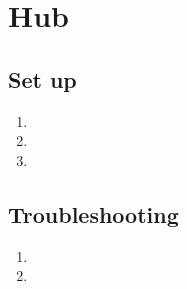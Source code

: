   \section{Hub}
  \subsection{Set up}
    \begin{enumerate}
      \item

      \item

      \item
    \end{enumerate}

  \subsection{Troubleshooting}

  \begin{enumerate}
    \item
    \item
  \end{enumerate}
